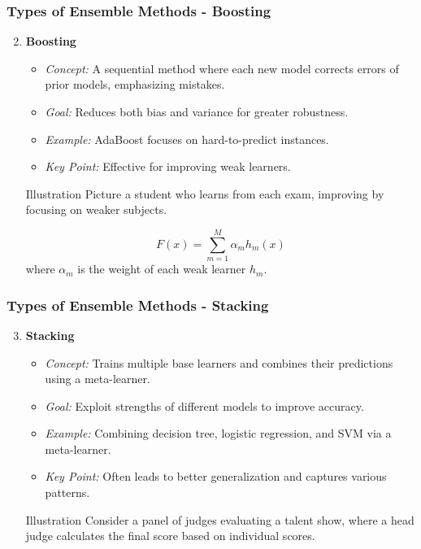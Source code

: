 \documentclass[aspectratio=169]{beamer}
\begin{document}
\begin{frame}[fragile]
  \frametitle{Types of Ensemble Methods - Boosting}
  \begin{enumerate}
    \setcounter{enumi}{1}
    \item \textbf{Boosting}
      \begin{itemize}
        \item \textit{Concept:} A sequential method where each new model corrects errors of prior models, emphasizing mistakes.
        \item \textit{Goal:} Reduces both bias and variance for greater robustness.
        \item \textit{Example:} AdaBoost focuses on hard-to-predict instances.
        \item \textit{Key Point:} Effective for improving weak learners.
      \end{itemize}

      \begin{block}{Illustration}
        Picture a student who learns from each exam, improving by focusing on weaker subjects.
      \end{block}

      \begin{equation}
      F(x) = \sum_{m=1}^{M} \alpha_m h_m(x)
      \end{equation}
      where \( \alpha_m \) is the weight of each weak learner \( h_m \).
  \end{enumerate}
\end{frame}

\begin{frame}[fragile]
  \frametitle{Types of Ensemble Methods - Stacking}
  \begin{enumerate}
    \setcounter{enumi}{2}
    \item \textbf{Stacking}
      \begin{itemize}
        \item \textit{Concept:} Trains multiple base learners and combines their predictions using a meta-learner.
        \item \textit{Goal:} Exploit strengths of different models to improve accuracy.
        \item \textit{Example:} Combining decision tree, logistic regression, and SVM via a meta-learner.
        \item \textit{Key Point:} Often leads to better generalization and captures various patterns.
      \end{itemize}

      \begin{block}{Illustration}
        Consider a panel of judges evaluating a talent show, where a head judge calculates the final score based on individual scores.
      \end{block}
  \end{enumerate}
\end{frame}
\end{document}
